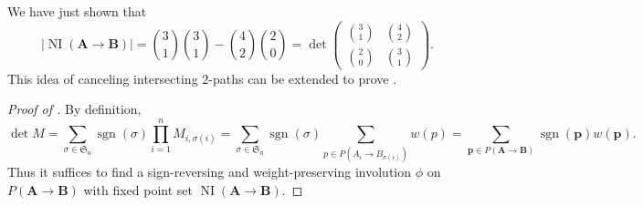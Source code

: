 \documentclass[oneside]{book}
\numberwithin{equation}{section}
\theoremstyle{definition}
\newcommand\NI{\operatorname{NI}}
\newcommand\sgn{\operatorname{sgn}}
\newcommand\sym{\mathfrak{S}}
\renewcommand\vec[1]{\bm{#1}}
\begin{document}
We have just shown that
\[
  |\NI(\vec A\to \vec B)|  =
  \binom{3}{1}\binom{3}{1} - \binom{4}{2} \binom{2}{0}
=     \det \begin{pmatrix}
\binom{3}{1} & \binom{4}{2}\\[4pt]
\binom{2}{0} & \binom{3}{1}
           \end{pmatrix}.
\]
This idea of canceling intersecting \( 2 \)-paths can be extended to
prove .

\begin{proof}[Proof of ]
  By definition,
\[
  \det M = \sum_{\sigma\in \sym_n} \sgn(\sigma) \prod_{i=1}^{n} M_{i,\sigma(i)}
  = \sum_{\sigma\in \sym_n} \sgn(\sigma) \sum_{p\in P(A_i\to B_{\sigma(i)})} w(p)
  = \sum_{\vec p \in P(\vec A\to \vec B)} \sgn(\vec p) w(\vec p).
\]
Thus it suffices to find a sign-reversing and weight-preserving
involution \( \phi \) on \( P(\vec A\to \vec B) \) with fixed point
set \( \NI(\vec A\to \vec B) \).


\end{proof}
\end{document}
